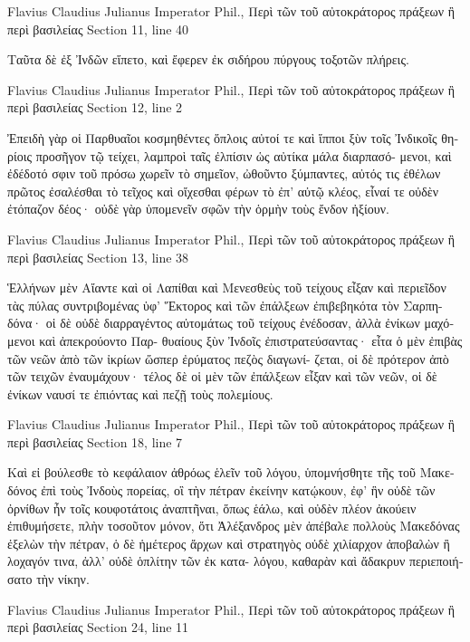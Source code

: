 \documentclass[12pt,letterpaper,twoside,final]{memoir}
\begin{document}
\begin{greek}
Flavius Claudius Julianus Imperator Phil., Περὶ τῶν τοῦ αὐτοκράτορος πράξεων ἢ περὶ βασιλείας 
Section 11, line 40

                                                   Ταῦτα δὲ ἐξ 
Ἰνδῶν εἵπετο, καὶ ἔφερεν ἐκ σιδήρου πύργους τοξοτῶν 
πλήρεις. 



Flavius Claudius Julianus Imperator Phil., Περὶ τῶν τοῦ αὐτοκράτορος πράξεων ἢ περὶ βασιλείας 
Section 12, line 2

Ἐπειδὴ γὰρ οἱ Παρθυαῖοι κοσμηθέντες ὅπλοις αὐτοί 
τε καὶ ἵπποι ξὺν τοῖς Ἰνδικοῖς θηρίοις προσῆγον τῷ 
τείχει, λαμπροὶ ταῖς ἐλπίσιν ὡς αὐτίκα μάλα διαρπασό-
μενοι, καὶ ἐδέδοτό σφιν τοῦ πρόσω χωρεῖν τὸ σημεῖον,   
ὠθοῦντο ξύμπαντες, αὐτός τις ἐθέλων πρῶτος ἐσαλέσθαι 
τὸ τεῖχος καὶ οἴχεσθαι φέρων τὸ ἐπ' αὐτῷ κλέος, εἶναί τε 
οὐδὲν ἐτόπαζον δέος· οὐδὲ γὰρ ὑπομενεῖν σφῶν τὴν ὁρμὴν 
τοὺς ἔνδον ἠξίουν. 



Flavius Claudius Julianus Imperator Phil., Περὶ τῶν τοῦ αὐτοκράτορος πράξεων ἢ περὶ βασιλείας 
Section 13, line 38

Ἑλλήνων μὲν Αἴαντε καὶ οἱ Λαπίθαι καὶ Μενεσθεὺς τοῦ 
τείχους εἶξαν καὶ περιεῖδον τὰς πύλας συντριβομένας 
ὑφ' Ἕκτορος καὶ τῶν ἐπάλξεων ἐπιβεβηκότα τὸν Σαρπη-
δόνα· οἱ δὲ οὐδὲ διαρραγέντος αὐτομάτως τοῦ τείχους 
ἐνέδοσαν, ἀλλὰ ἐνίκων μαχόμενοι καὶ ἀπεκρούοντο Παρ-
θυαίους ξὺν Ἰνδοῖς ἐπιστρατεύσαντας· εἶτα ὁ μὲν ἐπιβὰς 
τῶν νεῶν ἀπὸ τῶν ἰκρίων ὥσπερ ἐρύματος πεζὸς διαγωνί-
ζεται, οἱ δὲ πρότερον ἀπὸ τῶν τειχῶν ἐναυμάχουν· τέλος 
δὲ οἱ μὲν τῶν ἐπάλξεων εἶξαν καὶ τῶν νεῶν, οἱ δὲ ἐνίκων 
ναυσί τε ἐπιόντας καὶ πεζῇ τοὺς πολεμίους. 



Flavius Claudius Julianus Imperator Phil., Περὶ τῶν τοῦ αὐτοκράτορος πράξεων ἢ περὶ βασιλείας 
Section 18, line 7

Καὶ εἰ βούλεσθε τὸ κεφάλαιον ἀθρόως ἑλεῖν τοῦ λόγου, 
ὑπομνήσθητε τῆς τοῦ Μακεδόνος ἐπὶ τοὺς Ἰνδοὺς πορείας, 
οἳ τὴν πέτραν ἐκείνην κατῴκουν, ἐφ' ἣν οὐδὲ τῶν ὀρνίθων 
ἦν τοῖς κουφοτάτοις ἀναπτῆναι, ὅπως ἑάλω, καὶ οὐδὲν 
πλέον ἀκούειν ἐπιθυμήσετε, πλὴν τοσοῦτον μόνον, ὅτι 
Ἀλέξανδρος μὲν ἀπέβαλε πολλοὺς Μακεδόνας ἐξελὼν τὴν 
πέτραν, ὁ δὲ ἡμέτερος ἄρχων καὶ στρατηγὸς οὐδὲ χιλίαρχον 
ἀποβαλὼν ἢ λοχαγόν τινα, ἀλλ' οὐδὲ ὁπλίτην τῶν ἐκ κατα-
λόγου, καθαρὰν καὶ ἄδακρυν περιεποιήσατο τὴν νίκην. 



Flavius Claudius Julianus Imperator Phil., Περὶ τῶν τοῦ αὐτοκράτορος πράξεων ἢ περὶ βασιλείας 
Section 24, line 11


\end{greek}
\end{document}
